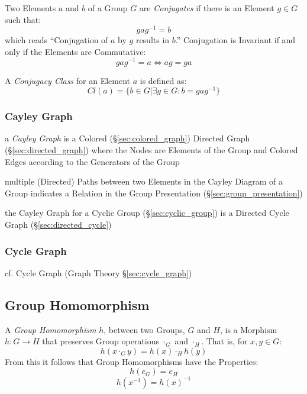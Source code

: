 Two Elements $a$ and $b$ of a Group $G$ are \emph{Conjugates} if there is an
Element $g \in G$ such that:
\[
    gag^{-1} = b
\]
which reads ``Conjugation of $a$ by $g$ results in $b$.'' Conjugation is
Invariant if and only if the Elements are Commutative:
\[
    gag^{-1} = a \Leftrightarrow ag = ga
\]

A \emph{Conjugacy Class} for an Element $a$ is defined as:
\[
    Cl(a) = \{ b \in G | \exists g \in G : b = gag^{-1}\}
\]



\subsubsection{Cayley Graph}\label{sec:cayley_graph}

a \emph{Cayley Graph} is a Colored (\S\ref{sec:colored_graph}) Directed Graph
(\S\ref{sec:directed_graph}) where the Nodes are Elements of the Group and
Colored Edges according to the Generators of the Group

multiple (Directed) Paths between two Elements in the Cayley Diagram of a Group
indicates a Relation in the Group Presentation (\S\ref{sec:group_presentation})

the Cayley Graph for a Cyclic Group (\S\ref{sec:cyclic_group}) is a Directed
Cycle Graph (\S\ref{sec:directed_cycle})



\subsubsection{Cycle Graph}\label{sec:group_cycle_graph}

cf. Cycle Graph (Graph Theory \S\ref{sec:cycle_graph})



\subsection{Group Homomorphism}\label{sec:group_homomorphism}

A \emph{Group Homomorphism} $h$, between two Groups, $G$ and $H$, is a
Morphism $h : G \rightarrow H$ that preserves Group operations
$\cdot_G$ and $\cdot_H$. That is, for $x,y \in G$:
\[
    h(x \cdot_G y) = h(x) \cdot_H h(y)
\]
From this it follows that Group Homomorphisms have the Properties:
\[
    h(e_G) = e_H
\]\[
    h(x^{-1}) = h(x)^{-1}
\]


